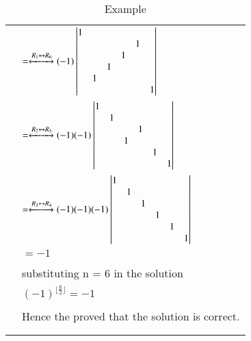 \documentclass[journal,12pt]{IEEEtran}
\begin{document}
\begin{longtable}{|l|l|}
& $ = \xleftrightarrow[]{R_1 \leftrightarrow R_6}
(-1)\begin{vmatrix}
1& & & & & \\ & & & &1& \\ & & &1& & \\ & &1& & & \\ &1& & & & \\ & & & & &1 
\end{vmatrix}$\\
& $ = \xleftrightarrow[]{R_2 \leftrightarrow R_5}
(-1)(-1)\begin{vmatrix}
1& & & & & \\ &1& & & & \\ & & &1& & \\ & &1& & & \\ & & & &1& \\ & & & & &1 
\end{vmatrix}$\\
& $ = \xleftrightarrow[]{R_3 \leftrightarrow R_4}
(-1)(-1)(-1)\begin{vmatrix}
1& & & & & \\ &1& & & & \\ & &1& & & \\ & & &1& & \\ & & & &1& \\ & & & & &1 
\end{vmatrix}$\\
& $ = -1$\\
& \\
& substituting n = 6 in the solution\\
& $(-1)^{\lfloor \frac{6}{2} \rfloor} = -1$\\
& \\
& Hence the proved that the solution is correct.\\
& \\
\hline
\caption{Example}
\label{table:2}
\end{longtable}
\end{document}
